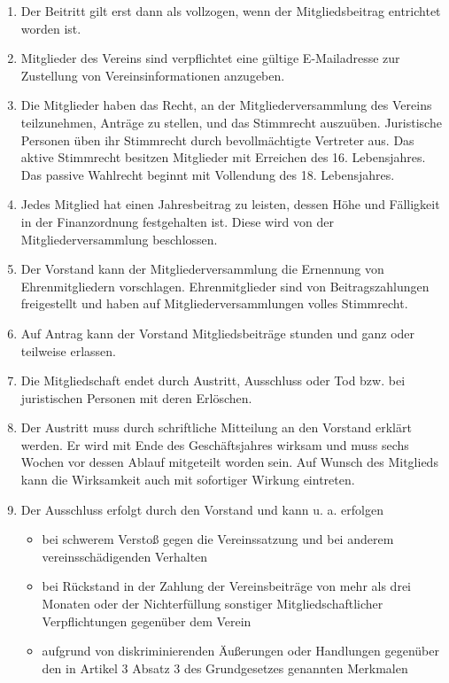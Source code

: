 \documentclass[parskip=half]{scrartcl}
\begin{document}
\begin{contract}
\begin{enumerate}
\begin{enumerate}
				\item Der Beitritt gilt erst dann als vollzogen, wenn der Mitgliedsbeitrag entrichtet worden ist.
				\item Mitglieder des Vereins sind verpflichtet eine gültige E-Mailadresse zur Zustellung von Vereinsinformationen anzugeben.
				\item Die Mitglieder haben das Recht, an der Mitgliederversammlung des Vereins teilzunehmen, Anträge zu stellen, und das Stimmrecht auszuüben. Juristische Personen üben ihr Stimmrecht durch bevollmächtigte Vertreter aus. Das aktive Stimmrecht besitzen Mitglieder mit Erreichen des 16. Lebensjahres. Das passive Wahlrecht beginnt mit Vollendung des 18. Lebensjahres.
				\item Jedes Mitglied hat einen Jahresbeitrag zu leisten, dessen Höhe und Fälligkeit in der Finanzordnung festgehalten ist. Diese wird von der Mitgliederversammlung beschlossen.
				\item Der Vorstand kann der Mitgliederversammlung die Ernennung von Ehrenmitgliedern vorschlagen. Ehrenmitglieder sind von Beitragszahlungen freigestellt und haben auf Mitgliederversammlungen volles Stimmrecht.
				\item Auf Antrag kann der Vorstand Mitgliedsbeiträge stunden und ganz oder teilweise erlassen.
				\item Die Mitgliedschaft endet durch Austritt, Ausschluss oder Tod bzw. bei juristischen Personen mit deren Erlöschen.
				\item Der Austritt muss durch schriftliche Mitteilung an den Vorstand erklärt werden. Er wird mit Ende des Geschäftsjahres wirksam und muss sechs Wochen vor dessen Ablauf mitgeteilt worden sein. Auf Wunsch des Mitglieds kann die Wirksamkeit auch mit sofortiger Wirkung eintreten.
				\item Der Ausschluss erfolgt durch den Vorstand und kann u. a. erfolgen
				\begin{itemize}
					\item bei schwerem Verstoß gegen die Vereinssatzung und bei anderem vereinsschädigenden Verhalten
					\item bei Rückstand in der Zahlung der Vereinsbeiträge von mehr als drei Monaten oder der Nichterfüllung sonstiger Mitgliedschaftlicher Verpflichtungen gegenüber dem Verein
					\item aufgrund von diskriminierenden Äußerungen oder Handlungen gegenüber den in Artikel 3 Absatz 3 des Grundgesetzes genannten Merkmalen
				\end{itemize}

\end{enumerate}
\end{enumerate}
\end{contract}
\end{document}
